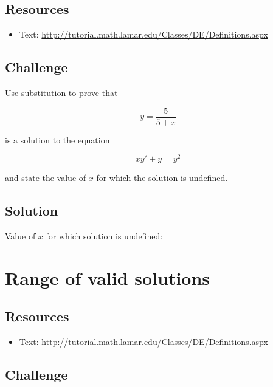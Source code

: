 \subsection*{Resources}
\begin{itemize}
    \item Text: \url{http://tutorial.math.lamar.edu/Classes/DE/Definitions.aspx}
\end{itemize}

\subsection*{Challenge}

Use substitution to prove that

\begin{equation}
    y=\frac{5}{5+x}
\end{equation}

is a solution to the equation

\begin{equation}
    x y'+y=y^2
\end{equation}

and state the value of $x$ for which the solution is undefined.

\subsection*{Solution}
Value of $x$ for which solution is undefined: \six{}


\timebox


\newpage

\section{Range of valid solutions}

\subsection*{Resources}
\begin{itemize}
    \item Text: \url{http://tutorial.math.lamar.edu/Classes/DE/Definitions.aspx}
\end{itemize}

\subsection*{Challenge}

